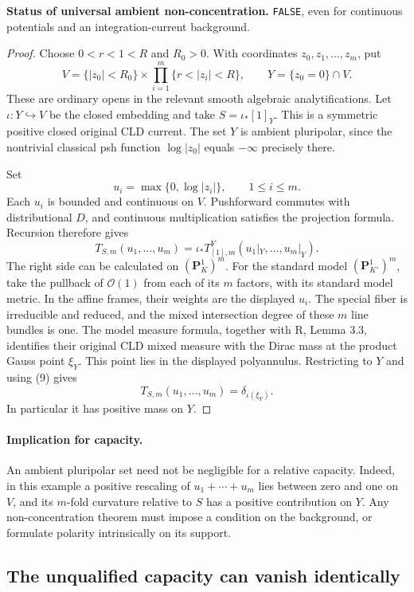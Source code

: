 \documentclass[11pt,a4paper]{article}
\numberwithin{equation}{section}
\theoremstyle{definition}
\theoremstyle{remark}
\begin{document}
\noindent\textbf{Status of universal ambient non-concentration.}
\texttt{FALSE}, even for continuous potentials and an integration-current
background.

\begin{proof}
Choose \(0<r<1<R\) and \(R_0>0\). With coordinates
\(z_0,z_1,\ldots,z_m\), put
\[
 V=\{|z_0|<R_0\}\times
       \prod_{i=1}^m\{r<|z_i|<R\},
 \qquad Y=\{z_0=0\}\cap V.
\]
These are ordinary opens in the relevant smooth algebraic
analytifications. Let \(\iota:Y\hookrightarrow V\) be the closed
embedding and take \(S=\iota_*[1]_Y\). This is a symmetric positive
closed original CLD current. The set \(Y\) is ambient pluripolar,
since the nontrivial classical psh function \(\log|z_0|\) equals
\(-\infty\) precisely there.

Set
\[
 u_i=\max\{0,\log|z_i|\},\qquad 1\leq i\leq m.
\]
Each \(u_i\) is bounded and continuous on \(V\). Pushforward commutes
with distributional \(D\), and continuous multiplication satisfies the
projection formula. Recursion therefore gives
\[
 T_{S,m}(u_1,\ldots,u_m)
   =\iota_* T^Y_{[1],m}(u_1|_Y,\ldots,u_m|_Y).
\tag{9}
\]
The right side can be calculated on
\((\mathbf P^1_K)^m\). For the standard model
\((\mathbf P^1_{K^\circ})^m\), take the pullback of
\(\mathcal O(1)\) from each of its \(m\) factors, with its standard
model metric. In the affine frames, their weights are the displayed
\(u_i\). The special fiber is irreducible and reduced, and the mixed
intersection degree of these \(m\) line bundles is one. The model
measure formula, together with R, Lemma 3.3, identifies their original
CLD mixed measure with the Dirac mass at the product Gauss point
\(\xi_Y\). This point lies in the displayed polyannulus. Restricting
to \(Y\) and using (9) gives
\[
 T_{S,m}(u_1,\ldots,u_m)=\delta_{\iota(\xi_Y)}.
\]
In particular it has positive mass on \(Y\).
\end{proof}

\paragraph{Implication for capacity.}
An ambient pluripolar set need not be negligible for a relative
capacity. Indeed, in this example a positive rescaling of
\(u_1+\cdots+u_m\) lies between zero and one on \(V\), and its
\(m\)-fold curvature relative to \(S\) has a positive contribution
on \(Y\). Any non-concentration theorem must impose a condition on
the background, or formulate polarity intrinsically on its support.

\subsection{The unqualified capacity can vanish identically}
\end{document}
